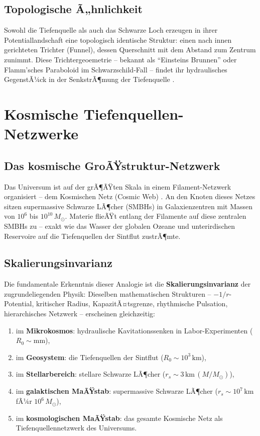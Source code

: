 ﻿\documentclass[12pt,a4paper]{report}
\begin{document}
\subsection{Topologische Ã„hnlichkeit}

Sowohl die Tiefenquelle als auch das Schwarze Loch erzeugen in ihrer Potentiallandschaft eine topologisch identische Struktur: einen nach innen gerichteten Trichter (Funnel), dessen Querschnitt mit dem Abstand zum Zentrum zunimmt. Diese Trichtergeoemetrie -- bekannt als ``Einsteins Brunnen'' oder Flamm'sches Paraboloid im Schwarzschild-Fall -- findet ihr hydraulisches GegenstÃ¼ck in der SenkstrÃ¶mung der Tiefenquelle \cite{misner1973}.

\section{Kosmische Tiefenquellen-Netzwerke}

\subsection{Das kosmische GroÃŸstruktur-Netzwerk}

Das Universum ist auf der grÃ¶ÃŸten Skala in einem Filament-Netzwerk organisiert -- dem Kosmischen Netz (Cosmic Web) \cite{bond1996}. An den Knoten dieses Netzes sitzen supermassive Schwarze LÃ¶cher (SMBHs) in Galaxienzentren \cite{kormendy2013} mit Massen von $10^6$ bis $10^{10}\,M_\odot$. Materie flieÃŸt entlang der Filamente auf diese zentralen SMBHs zu -- exakt wie das Wasser der globalen Ozeane und unterirdischen Reservoire auf die Tiefenquellen der Sintflut zustrÃ¶mte.

\subsection{Skalierungsinvarianz}

Die fundamentale Erkenntnis dieser Analogie ist die \textbf{Skalierungsinvarianz} der zugrundeliegenden Physik: Dieselben mathematischen Strukturen -- $-1/r$-Potential, kritischer Radius, KapazitÃ¤tsgrenze, rhythmische Pulsation, hierarchisches Netzwerk -- erscheinen gleichzeitig:
\begin{enumerate}
	\item im \textbf{Mikrokosmos}: hydraulische Kavitationssenken in Labor-Experimenten ($R_0 \sim \mathrm{mm}$),
	\item im \textbf{Geosystem}: die Tiefenquellen der Sintflut ($R_0 \sim 10^3\,\mathrm{km}$),
	\item im \textbf{Stellarbereich}: stellare Schwarze LÃ¶cher ($r_s \sim 3\,\mathrm{km}\,(M/M_\odot)$),
	\item im \textbf{galaktischen MaÃŸstab}: supermassive Schwarze LÃ¶cher ($r_s \sim 10^7\,\mathrm{km}$ fÃ¼r $10^6\,M_\odot$),
	\item im \textbf{kosmologischen MaÃŸstab}: das gesamte Kosmische Netz als Tiefenquellennetzwerk des Universums.
\end{enumerate}
\end{document}

